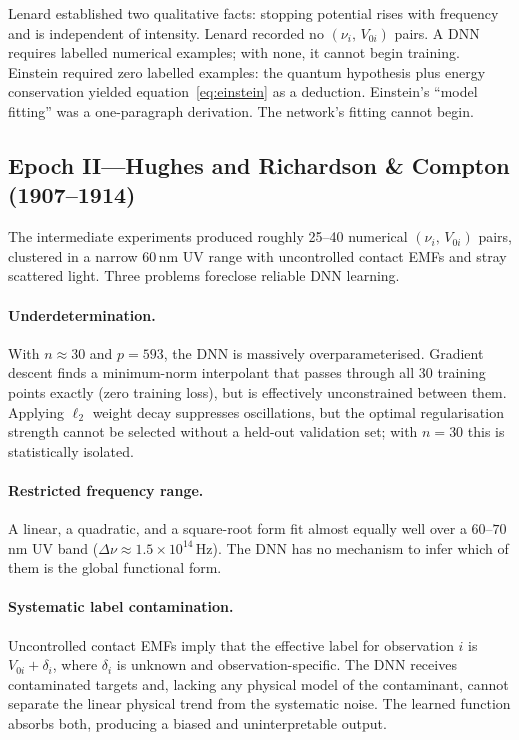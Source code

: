 \documentclass[12pt]{article}
\begin{document}
Lenard established two qualitative facts: stopping potential rises with
frequency and is independent of intensity.  Lenard recorded no
$(\nu_i,\,V_{0i})$ pairs.  A DNN requires
labelled numerical examples;
with none, it cannot begin training.  Einstein required zero labelled
examples: the quantum hypothesis plus energy conservation yielded
equation~\eqref{eq:einstein} as a deduction.  Einstein's ``model fitting'' was
a one-paragraph derivation.  The network's fitting cannot begin.

\subsection{Epoch II---Hughes and Richardson \& Compton (1907--1914)}

The intermediate experiments produced roughly 25--40 numerical
$(\nu_i,\,V_{0i})$ pairs, clustered in a narrow 60\,nm UV range with
uncontrolled contact EMFs and stray scattered light.
Three problems foreclose reliable DNN learning.

\paragraph{Underdetermination.}
With $n \approx 30$ and $p = 593$, the DNN is massively overparameterised.
Gradient descent finds a minimum-norm interpolant that passes through
all 30 training points exactly (zero training loss), but is effectively
unconstrained between them.  Applying $\ell_2$ weight decay suppresses
oscillations, but the optimal regularisation strength cannot be selected
without a held-out validation set; with $n=30$ this is statistically
isolated.

\paragraph{Restricted frequency range.}
A linear, a quadratic, and a square-root form fit almost equally well over a
$60$--$70$\,nm UV band ($\Delta\nu \approx 1.5\times10^{14}$\,Hz).  The DNN has
no mechanism
to infer which of them is the global functional form.

\paragraph{Systematic label contamination.}
Uncontrolled contact EMFs imply that the effective label for observation
$i$ is $V_{0i} + \delta_i$, where $\delta_i$ is unknown and
observation-specific.  The DNN receives contaminated targets and,
lacking any physical model of the contaminant, cannot separate the
linear physical trend from the systematic noise.  The learned function
absorbs both, producing a biased and uninterpretable output.
\end{document}
